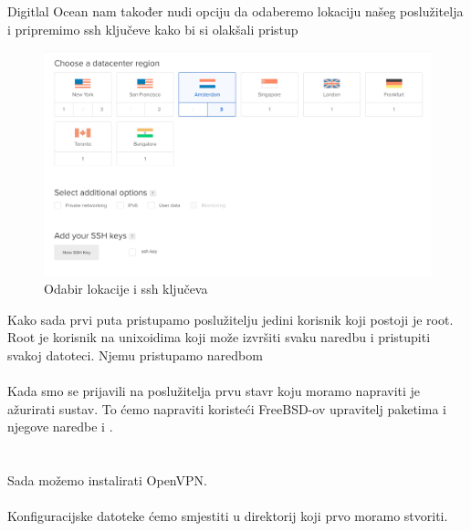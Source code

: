     \newpage
    \noindent
    Digitlal Ocean nam također nudi opciju da odaberemo lokaciju našeg poslužitelja
    i pripremimo ssh ključeve kako bi si olakšali pristup
    \begin{figure}[h]
        \centering
        \includegraphics[scale=0.15]{slike/lokacijaIssh}
        \caption{Odabir lokacije i ssh ključeva}
    \end{figure}

    Kako sada prvi puta pristupamo poslužitelju jedini korisnik
    koji postoji je root. Root je korisnik na unixoidima koji može izvršiti
    svaku naredbu i pristupiti svakoj datoteci. Njemu pristupamo naredbom \\
    
    \noindent
     \\

    Kada smo se prijavili na poslužitelja prvu stavr koju moramo napraviti je
    ažurirati sustav. To ćemo napraviti koristeći FreeBSD-ov upravitelj
    paketima  i njegove naredbe  i . \\

    \noindent
     \\
     \\

    Sada možemo instalirati OpenVPN. \\

    \noindent
     \\

    Konfiguracijske datoteke ćemo smjestiti u direktorij
     koji prvo moramo stvoriti. \\

    \noindent
     \\

